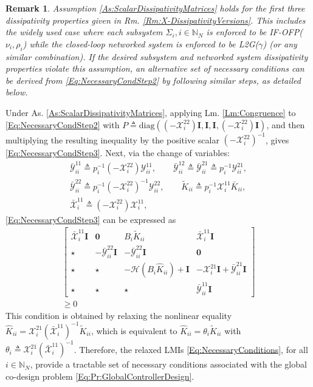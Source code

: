 \documentclass[letterpaper, 10 pt, conference]{ieeeconf}%
\newcommand{\N}{\mathbb{N}}
\newcommand{\I}{\mathbf{I}}
\newcommand{\0}{\mathbf{0}}
\newcommand{\X}{\mathcal{X}}
\newcommand{\Y}{\mathcal{Y}}
\newcommand{\x}{{\scriptstyle \X}}
\newcommand{\y}{{\scriptstyle \Y}}
\newcommand{\diag}{\text{diag}}
\newcommand{\bm}[1]{\begin{bmatrix}#1\end{bmatrix}}
\newtheorem{remark}{\textbf{Remark}}
\begin{document}
\begin{remark}
Assumption \ref{As:ScalarDissipativityMatrices} holds for the first three dissipativity properties given in Rm. \ref{Rm:X-DissipativityVersions}. This includes the widely used case where each subsystem $\Sigma_i, i\in\N_N$ is enforced to be IF-OFP($\nu_i,\rho_i$) while the closed-loop networked system is enforced to be L2G($\gamma$) (or any similar combination). If the desired subsystem and networked system dissipativity properties violate this assumption, an alternative set of necessary conditions can be derived from \eqref{Eq:NecessaryCondStep2} by following similar steps, as detailed below. 
\end{remark}
Under As. \ref{As:ScalarDissipativityMatrices}, applying Lm. \ref{Lm:Congruence} to \eqref{Eq:NecessaryCondStep2} with \(P\triangleq\diag((-\x_i^{22})\I,\I,\I,(-\x_i^{22})\I)\), and then multiplying the resulting inequality by the positive scalar \((-\x_i^{22})^{-1}\), gives \eqref{Eq:NecessaryCondStep3}.
Next, via the change of variables: 
\begin{equation}\label{Eq:ChangeOfVariables}
\begin{gathered}
\bar{\y}_{ii}^{11} \triangleq p_i^{-1}(-\x_i^{22})\y^{11}_{ii}, \quad \quad
\bar{\y}_{ii}^{12} \triangleq \bar{\y}_{ii}^{21} \triangleq p_i^{-1}\y^{21}_{ii},\\
\bar{\y}_{ii}^{22} \triangleq p_i^{-1}(-\x_i^{22})^{-1}\y^{22}_{ii}, \quad \quad
\tilde{K}_{ii} \triangleq p_i^{-1}\x_i^{11} \bar{K}_{ii}, \\
\bar{\x}_i^{11} \triangleq (-\x_i^{22})\x_i^{11},
\end{gathered}
\end{equation}
\eqref{Eq:NecessaryCondStep3} can be expressed as 
\begin{equation}\label{Eq:NecessaryConditions}
\begin{aligned}
\bm{
\bar{\x}_i^{11}\I & \0 & B_i \tilde{K}_{ii} & \bar{\x}_i^{11}\I \\
\star & -\bar{\y}_{ii}^{22}\I & -\bar{\y}_{ii}^{22}\I & \0 \\ 
\star& \star & -\mathcal{H}(B_i\hat{K}_{ii}) + \I & -\x_i^{21}\I+ \bar{\y}_{ii}^{21}\I \\
\star & \star & \star &  \bar{\y}_{ii}^{11}\I
} \\ \geq 0 
\end{aligned}
\end{equation}
This condition is obtained by relaxing the nonlinear equality $\hat{K}_{ii}=\x_i^{21}(\bar{\x}_i^{11})^{-1}\tilde K_{ii}$, which is equivalent to 
$\hat{K}_{ii}=\theta_i\tilde K_{ii}$ with $\theta_i \triangleq \x^{21}_i(\bar{\x}_i^{11})^{-1}$. Therefore, the relaxed LMIs \eqref{Eq:NecessaryConditions}, for all $i\in\N_N$, provide a tractable set of necessary conditions associated with the global co-design problem \eqref{Eq:Pr:GlobalControllerDesign}.
 
\end{document}

